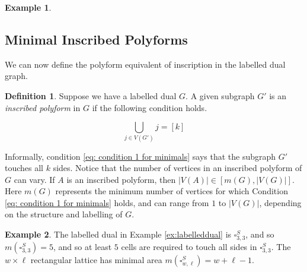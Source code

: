 \documentclass[12pt]{article}
\theoremstyle{plain}
\theoremstyle{definition}
\theoremstyle{remark}
\theoremstyle{definition}
\newtheorem{definition}{Definition}[section]
\newtheorem{exmp}{Example}[section]
\begin{document}
\begin{exmp}
\begin{center}
    \label{fig:labelled dual of the square lattice}
\end{center}

\end{exmp}

\subsection{Minimal Inscribed Polyforms}

We can now define the polyform equivalent of inscription in the labelled dual graph.

\begin{definition}\label{def:inscribedpolyfrom}
    Suppose we have a labelled dual $G$. A given subgraph $G'$ is an \textit{inscribed polyform} in $G$ if the following condition holds.

    \begin{equation}\label{eq: condition 1 for minimals}
        \bigcup_{j \in V(G')} j = [k]
    \end{equation}
\end{definition}

Informally, condition \ref{eq: condition 1 for minimals} says that the subgraph $G'$ touches all $k$ sides. Notice that the number of vertices in an inscribed polyform of $G$ can vary. If $A$ is an inscribed polyform, then $|V(A)| \in [m(G),|V(G)|]$.  Here $m(G)$ represents the minimum number of vertices for which Condition \ref{eq: condition 1 for minimals} holds, and can range from $1$ to $|V(G)|$, depending on the structure and labelling of $G$.

\begin{exmp}
    The labelled dual in Example \ref{ex:labelleddual} is $\square^S_{3,3}$, and so $m(\square^S_{3,3}) = 5$, and so at least $5$ cells are required to touch all sides in $\square^S_{3,3}$. The $w \times \ell$ rectangular lattice has minimal area $m(\square^S_{w,\ell}) = w+\ell-1$.
\end{exmp}
\end{document}

